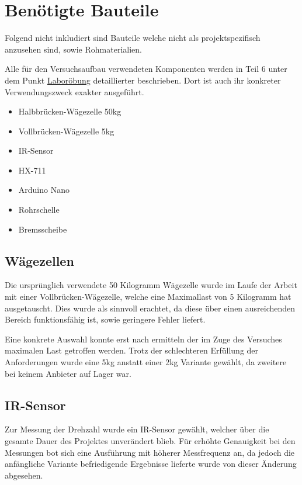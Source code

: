 \section{Benötigte Bauteile}

Folgend nicht inkludiert sind Bauteile welche nicht als projektspezifisch anzusehen sind, sowie Rohmaterialien.

Alle für den Versuchsaufbau verwendeten Komponenten werden in Teil 6 unter dem Punkt \hyperref[labuebung]{Laboröbung} detaillierter beschrieben.
Dort ist auch ihr konkreter Verwendungszweck exakter ausgeführt.

\begin{itemize}
    \item Halbbrücken-Wägezelle 50kg
    \item Vollbrücken-Wägezelle 5kg
    \item IR-Sensor
    \item HX-711
    \item Arduino Nano
    \item Rohrschelle
    \item Bremsscheibe
\end{itemize}

\subsection{Wägezellen}

Die ursprünglich verwendete 50 Kilogramm Wägezelle wurde im Laufe der Arbeit mit einer Vollbrücken-Wägezelle, welche eine Maximallast von 5 Kilogramm hat ausgetauscht.
Dies wurde als sinnvoll erachtet, da diese über einen ausreichenden Bereich funktionsfähig ist, sowie geringere Fehler liefert.

Eine konkrete Auswahl konnte erst nach ermitteln der im Zuge des Versuches maximalen Last getroffen werden.
Trotz der schlechteren Erfüllung der Anforderungen wurde eine 5kg anstatt einer 2kg Variante gewählt, da zweitere bei keinem Anbieter auf Lager war.

\subsection{IR-Sensor}

Zur Messung der Drehzahl wurde ein IR-Sensor gewählt, welcher über die gesamte Dauer des Projektes unverändert blieb.
Für erhöhte Genauigkeit bei den Messungen bot sich eine Ausführung mit höherer Messfrequenz an, da jedoch die anfängliche Variante befriedigende Ergebnisse lieferte wurde von dieser Änderung abgesehen.


